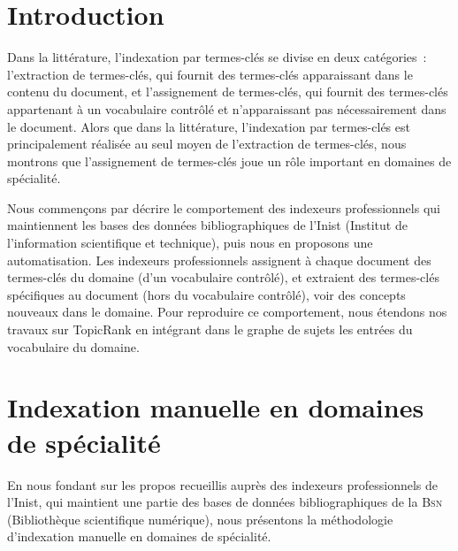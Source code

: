 \section{Introduction}
\label{sec:main:domain_specific_keyphrase_annotation-introduction}
  Dans la littérature, l'indexation
  par termes-clés se divise en deux catégories~: l'extraction de termes-clés,
  qui fournit des termes-clés apparaissant dans le contenu du document, et
  l'assignement de termes-clés, qui fournit des termes-clés appartenant à un
  vocabulaire contrôlé et n'apparaissant pas nécessairement dans le document.
  Alors que dans la littérature, l'indexation par termes-clés est
  principalement réalisée au seul moyen de l'extraction de termes-clés, nous
  montrons que l'assignement de termes-clés joue un rôle important en domaines
  de spécialité.

  Nous commençons par décrire le comportement des indexeurs
  professionnels qui maintiennent les bases des données bibliographiques de
  l'Inist (Institut de l'information scientifique et technique), puis nous en
  proposons une automatisation. Les indexeurs professionnels assignent à
  chaque document des termes-clés du domaine (d'un vocabulaire contrôlé), et
  extraient des termes-clés spécifiques au document (hors du vocabulaire
  contrôlé), voir des concepts nouveaux dans le domaine. Pour reproduire ce comportement, nous étendons nos travaux sur
  TopicRank en intégrant dans le graphe de sujets les entrées du vocabulaire
  du domaine.


\section{Indexation manuelle en domaines de spécialité}
\label{sec:main-domain_specific_keyphrase_annotation-manual_keyphrase_annotation}
  En nous fondant sur les  propos recueillis auprès des indexeurs
  professionnels de l'Inist, qui maintient une partie des bases de données
  bibliographiques de la \textsc{Bsn} (Bibliothèque scientifique numérique),
  nous présentons la méthodologie d'indexation manuelle en domaines de
  spécialité.

